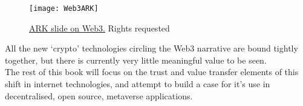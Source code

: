 \begin{figure}
  \centering
    \texttt{[image: Web3ARK]}
  \caption{\href{https://twitter.com/wintonARK/status/1486143239753060353}{ARK slide on Web3.} Rights requested}
  \label{fig:ARKWeb3}
\end{figure}
All the new `crypto' technologies circling the Web3 narrative are bound tightly together, but there is currently very little meaningful value to be seen.\\
The rest of this book will focus on the trust and value transfer elements of this shift in internet technologies, and attempt to build a case for it's use in decentralised, open source, metaverse applications.
